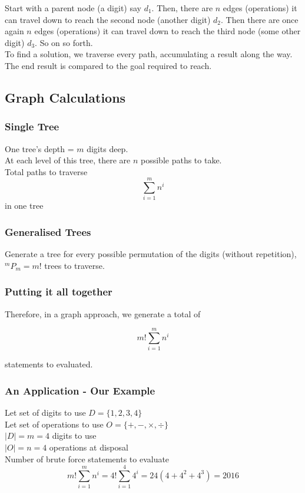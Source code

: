 \documentclass[12pt,a4paper]{article}
\begin{document}
\noindent Start with a parent node (a digit) say $d_1$. Then, there are $n$ edges (operations) it can travel down to reach the second node (another digit) $d_2$. Then there are once again $n$ edges (operations) it can travel down to reach the third node (some other digit) $d_3$. So on so forth.\\

To find a solution, we traverse every path, accumulating a result along the way. The end result is compared to the goal required to reach.

\pagebreak

\subsection*{Graph Calculations}

\subsubsection*{Single Tree}

\noindent One tree's depth = $m$ digits deep.\\

\noindent At each level of this tree, there are $n$ possible paths to take.\\

\noindent Total paths to traverse $$\sum_{i = 1}^{m} n^{i}$$ in one tree

\subsubsection*{Generalised Trees}

\noindent Generate a tree for every possible permutation of the digits (without repetition), $^{m}P_{m} = m!$ trees to traverse.\\

\subsubsection*{Putting it all together}
Therefore, in a graph approach, we generate a total of

\begin{framed}
$$m! \sum_{i = 1}^{m} n^{i}$$
\end{framed}

statements to evaluated.

\subsubsection*{An Application - Our Example}

Let set of digits to use $D = \lbrace 1, 2, 3, 4 \rbrace$\\
Let set of operations to use $O = \lbrace +, - , \times, \div \rbrace$\\

\noindent $|D| = m = 4$ digits to use\\
$|O| = n = 4$ operations at disposal\\

\noindent Number of brute force statements to evaluate $$m! \sum_{i = 1}^{m} n^{i} = 4!\sum_{i = 1}^{4} 4^{i} = 24 (4 + 4^{2} + 4^{3}) = 2016$$
\end{document}
